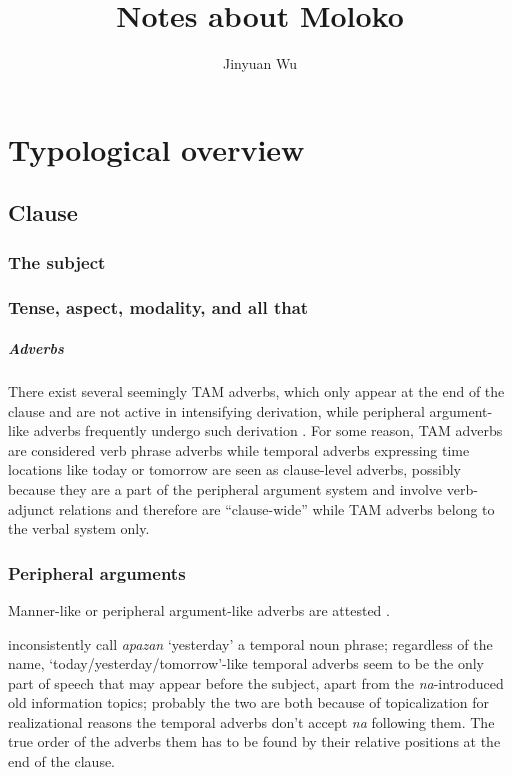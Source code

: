 \documentclass[a4paper, oneside, 12pt]{report}
\title{Notes about Moloko}
\author{Jinyuan Wu}
\newcommand*{\citepage}[1]{p.~{#1}}
\newcommand*{\citepages}[1]{pp.~{#1}}
\newcommand{\form}[1]{\emph{#1}}
\newcommand{\translate}[1]{`#1'}
\begin{document}
\automath

\maketitle

\chapter{Typological overview}

\section{Clause}

\subsection{The subject}

\subsection{Tense, aspect, modality, and all that}

\paragraph*{Adverbs}
There exist several seemingly TAM adverbs,
which only appear at the end of the clause 
and are not active in intensifying derivation,
while peripheral argument-like adverbs frequently undergo such derivation
\citep[\citepages{110-111}, (109-111)]{friesen2017grammar}.
For some reason, TAM adverbs are considered verb phrase adverbs 
while temporal adverbs expressing time locations like today or tomorrow 
are seen as clause-level adverbs,
possibly because they are a part of the peripheral argument system 
and involve verb-adjunct relations and therefore are ``clause-wide''
while TAM adverbs belong to the verbal system only.

\subsection{Peripheral arguments}

Manner-like or peripheral argument-like adverbs 
are attested \citep[\citepage{110}, (106-108)]{friesen2017grammar}.


\citet[\citepage308]{friesen2017grammar} 
inconsistently call \form{apazan} \translate{yesterday} 
a temporal noun phrase; 
regardless of the name, 
\translate{today/yesterday/tomorrow}-like temporal adverbs 
seem to be the only part of speech that may appear before the subject,
apart from the \form{na}-introduced old information topics;
probably the two are both because of topicalization
for realizational reasons the temporal adverbs don't accept \form{na} following them.
The true order of the adverbs them has to be found 
by their relative positions at the end of the clause.
\end{document}
